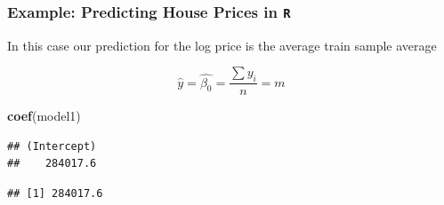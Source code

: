 \documentclass[
  shownotes,
  xcolor={svgnames},
  hyperref={colorlinks,citecolor=DarkBlue,linkcolor=DarkRed,urlcolor=DarkBlue}
  , aspectratio=169]{beamer}
\newenvironment{Shaded}{\begin{snugshade}}{\end{snugshade}}
\newcommand{\KeywordTok}[1]{\textcolor[rgb]{0.13,0.29,0.53}{\textbf{#1}}}
\newcommand{\NormalTok}[1]{#1}
\newcommand{\OperatorTok}[1]{\textcolor[rgb]{0.81,0.36,0.00}{\textbf{#1}}}
\begin{document}
\begin{frame}[fragile]
\frametitle{Example: Predicting House Prices in \texttt{R}}

In this case our prediction for the log price is the average train
sample average

\[
\hat{y}=\hat{\beta_0}=\frac{\sum y_i}{n}=m
\]

\begin{Shaded}
\footnotesize
\begin{Highlighting}[]
\KeywordTok{coef}\NormalTok{(model1)}
\end{Highlighting}
\end{Shaded}

\begin{tiny}
\begin{verbatim}
## (Intercept) 
##    284017.6
\end{verbatim}
\end{tiny}

\begin{Shaded}
\footnotesize
{}
\end{Shaded}

\begin{tiny}
\begin{verbatim}
## [1] 284017.6
\end{verbatim}
\end{tiny}

\end{frame}
\end{document}
